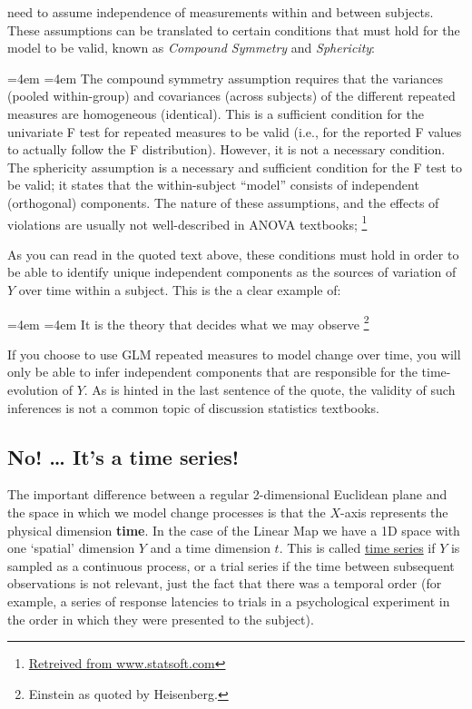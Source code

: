 \documentclass[]{book}
\let\rmarkdownfootnote\footnote%
\def\footnote{\protect\rmarkdownfootnote}
\renewenvironment{quote}{%
  \par \small \medskip \block
  \leftskip=4em \rightskip=4em%
  \noindent \ignorespaces}{%
  \par \medskip
  }
\begin{document}
need to assume independence of measurements within and between subjects.
These assumptions can be translated to certain conditions that must hold
for the model to be valid, known as \emph{Compound Symmetry} and
\emph{Sphericity}:

\begin{quote}
The compound symmetry assumption requires that the variances (pooled
within-group) and covariances (across subjects) of the different
repeated measures are homogeneous (identical). This is a sufficient
condition for the univariate F test for repeated measures to be valid
(i.e., for the reported F values to actually follow the F distribution).
However, it is not a necessary condition. The sphericity assumption is a
necessary and sufficient condition for the F test to be valid; it states
that the within-subject ``model'' consists of independent (orthogonal)
components. The nature of these assumptions, and the effects of
violations are usually not well-described in ANOVA textbooks; \footnote{\href{https://www.statsoft.com/Textbook/ANOVA-MANOVA\#sphericity}{Retreived
  from www.statsoft.com}}
\end{quote}

As you can read in the quoted text above, these conditions must hold in
order to be able to identify unique independent components as the
sources of variation of \(Y\) over time within a subject. This is the a
clear example of:

\begin{quote}
It is the theory that decides what we may observe \footnote{Einstein as
  quoted by Heisenberg.}
\end{quote}

If you choose to use GLM repeated measures to model change over time,
you will only be able to infer independent components that are
responsible for the time-evolution of \(Y\). As is hinted in the last
sentence of the quote, the validity of such inferences is not a common
topic of discussion statistics textbooks.

\subsection*{\texorpdfstring{\textbf{No! \ldots{} It's a time
series!}}{No! \ldots{} It's a time series!}}\label{no-its-a-time-series}

The important difference between a regular 2-dimensional Euclidean plane
and the space in which we model change processes is that the \(X\)-axis
represents the physical dimension \textbf{time}. In the case of the
Linear Map we have a 1D space with one `spatial' dimension \(Y\) and a
time dimension \(t\). This is called
\href{https://en.wikipedia.org/wiki/Time_series}{time series} if \(Y\)
is sampled as a continuous process, or a trial series if the time
between subsequent observations is not relevant, just the fact that
there was a temporal order (for example, a series of response latencies
to trials in a psychological experiment in the order in which they were
presented to the subject).
\end{document}
